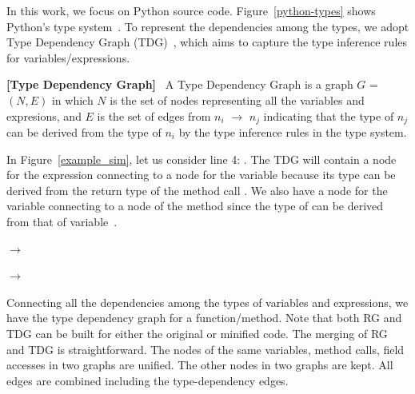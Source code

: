 In this work, we focus on Python source
code. Figure~\ref{python-types} shows Python's type
system~\cite{HiTyper-icse22}. To represent the dependencies among
the types, we adopt Type Dependency Graph
(TDG)~\cite{HiTyper-icse22}, which aims to capture the type
inference rules for variables/expressions.

\begin{definition}{\bf [Type Dependency Graph]}~\cite{HiTyper-icse22}
    \label{tdg-def}
A Type Dependency Graph is a graph $G$ = $(N,E)$ in which $N$ is the
set of nodes representing all the variables and expresions, and $E$ is
the set of edges from $n_i$ $\rightarrow$ $n_j$ indicating that the type of $n_j$
can be derived from the type of $n_i$ by the type inference rules in
the type system.
\end{definition}

In Figure~\ref{example_sim}, let us consider line 4: . The TDG will contain a node for the expression
 connecting to a node for the variable 
because its type can be derived from the return type of the method
call . We also have a node for the variable
 connecting to a node of the method 
since the type of  can be derived from
that of variable~.

 $\rightarrow$ 

 $\rightarrow$  


Connecting all the dependencies among the types of variables and
expressions, we have the type dependency graph for a
function/method. Note that both RG and TDG can be built for either
the original or minified code. The merging of RG and TDG is
straightforward. The nodes of the same variables, method calls, field
accesses in two graphs are unified.  The other nodes in two graphs are
kept. All edges are combined including the type-dependency edges.

